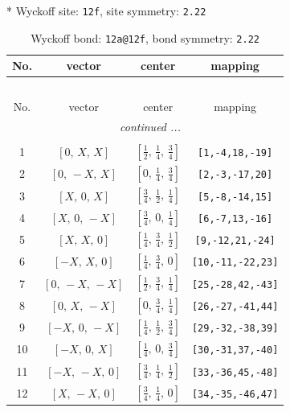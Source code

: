\documentclass[fleqn,8pt]{jsarticle}
\begin{document}
* Wyckoff site: {\tt 12f}, site symmetry: {\tt 2.22}
\renewcommand{\arraystretch}{1.2}
\begin{longtable}{cccc}
\caption{Wyckoff bond: {\tt 12a@12f}, bond symmetry: {\tt 2.22}}
 \\
 \hline \hline
No. & vector & center & mapping \\ \hline \endfirsthead

\multicolumn{3}{l}{\tablename\ \thetable{}} \\
 \hline \hline
No. & vector & center & mapping \\ \hline \endhead

 \hline \hline
\multicolumn{3}{r}{\footnotesize\it continued ...} \\ \endfoot

 \hline \hline
\multicolumn{3}{r}{} \\ \endlastfoot

1 & $\left[ 0,\, X,\, X \right]$ & $\left[ \frac{1}{2},\, \frac{1}{4},\, \frac{3}{4} \right]$ & {\tt [1,-4,18,-19]} \\ \hline
2 & $\left[ 0,\, - X,\, X \right]$ & $\left[ 0,\, \frac{1}{4},\, \frac{3}{4} \right]$ & {\tt [2,-3,-17,20]} \\ \hline
3 & $\left[ X,\, 0,\, X \right]$ & $\left[ \frac{3}{4},\, \frac{1}{2},\, \frac{1}{4} \right]$ & {\tt [5,-8,-14,15]} \\ \hline
4 & $\left[ X,\, 0,\, - X \right]$ & $\left[ \frac{3}{4},\, 0,\, \frac{1}{4} \right]$ & {\tt [6,-7,13,-16]} \\ \hline
5 & $\left[ X,\, X,\, 0 \right]$ & $\left[ \frac{1}{4},\, \frac{3}{4},\, \frac{1}{2} \right]$ & {\tt [9,-12,21,-24]} \\ \hline
6 & $\left[ - X,\, X,\, 0 \right]$ & $\left[ \frac{1}{4},\, \frac{3}{4},\, 0 \right]$ & {\tt [10,-11,-22,23]} \\ \hline
7 & $\left[ 0,\, - X,\, - X \right]$ & $\left[ \frac{1}{2},\, \frac{3}{4},\, \frac{1}{4} \right]$ & {\tt [25,-28,42,-43]} \\ \hline
8 & $\left[ 0,\, X,\, - X \right]$ & $\left[ 0,\, \frac{3}{4},\, \frac{1}{4} \right]$ & {\tt [26,-27,-41,44]} \\ \hline
9 & $\left[ - X,\, 0,\, - X \right]$ & $\left[ \frac{1}{4},\, \frac{1}{2},\, \frac{3}{4} \right]$ & {\tt [29,-32,-38,39]} \\ \hline
10 & $\left[ - X,\, 0,\, X \right]$ & $\left[ \frac{1}{4},\, 0,\, \frac{3}{4} \right]$ & {\tt [30,-31,37,-40]} \\ \hline
11 & $\left[ - X,\, - X,\, 0 \right]$ & $\left[ \frac{3}{4},\, \frac{1}{4},\, \frac{1}{2} \right]$ & {\tt [33,-36,45,-48]} \\ \hline
12 & $\left[ X,\, - X,\, 0 \right]$ & $\left[ \frac{3}{4},\, \frac{1}{4},\, 0 \right]$ & {\tt [34,-35,-46,47]} \\
\end{longtable}
\end{document}

